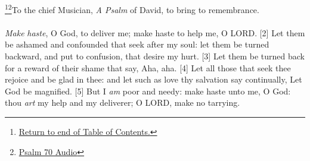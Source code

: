 \footnote{\textcolor[rgb]{0.00,0.25,0.00}{\hyperlink{TOC}{Return to end of Table of Contents.}}}\footnote{\href{https://audiobible.com/bible/psalms_70.html}{\textcolor[cmyk]{0.99998,1,0,0}{Psalm 70 Audio}}}\textcolor[cmyk]{0.99998,1,0,0}{To the chief Musician, \emph{A Psalm} of David, to bring to remembrance.}\\
\\
\textcolor[cmyk]{0.99998,1,0,0}{\emph{Make} \emph{haste}, O God, to deliver me; make haste to help me, O LORD.}
[2] \textcolor[cmyk]{0.99998,1,0,0}{Let them be ashamed and confounded that seek after my soul: let them be turned backward, and put to confusion, that desire my hurt.}
[3] \textcolor[cmyk]{0.99998,1,0,0}{Let them be turned back for a reward of their shame that say, Aha, aha.}
[4] \textcolor[cmyk]{0.99998,1,0,0}{Let all those that seek thee rejoice and be glad in thee: and let such as love thy salvation say continually, Let God be magnified.}
[5] \textcolor[cmyk]{0.99998,1,0,0}{But I \emph{am} poor and needy: make haste unto me, O God: thou \emph{art} my help and my deliverer; O LORD, make no tarrying.}






